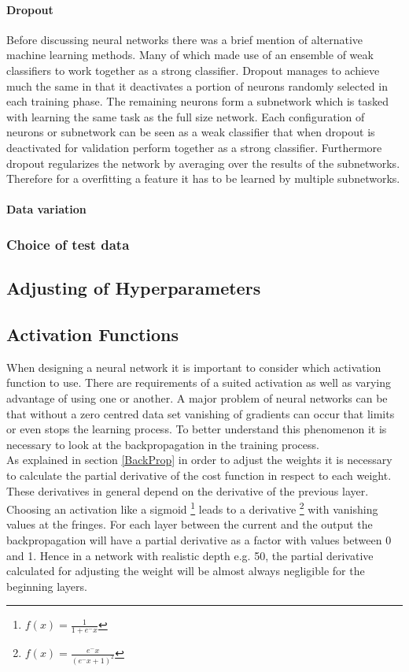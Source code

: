 				\paragraph{Dropout}
					Before discussing neural networks there was a brief mention of alternative machine learning methods. Many of which made use of an ensemble of weak classifiers to work together as a strong classifier. Dropout manages to achieve much the same in that it deactivates a portion of neurons randomly selected in each training phase. The remaining neurons form a subnetwork which is tasked with learning the same task as the full size network. Each configuration of neurons or subnetwork can be seen as a weak classifier that when dropout is deactivated for validation perform together as a strong classifier. Furthermore dropout regularizes the network by averaging over the results of the subnetworks. Therefore for a overfitting a feature it has to be learned by multiple subnetworks.
				\paragraph{Data variation}
					
			\subsubsection{Choice of test data}
		\subsection{Adjusting of Hyperparameters}
			
		\subsection{Activation Functions}
			When designing a neural network it is important to consider which activation function to use. There are requirements of a suited activation as well as varying advantage of using one or another. A major problem of neural networks can be that without a zero centred data set vanishing of gradients can occur that limits or even stops the learning process. To better understand this phenomenon it is necessary to look at the backpropagation in the training process.\\
			As explained in section \ref{BackProp} in order to adjust the weights it is necessary to calculate the partial derivative of the cost function in respect to each weight. These derivatives in general depend on the derivative of the previous layer. Choosing an activation like a sigmoid \footnote{$f(x)=\frac{1}{1+e^-x}$} leads to a derivative \footnote{$f(x)=\frac{e^-x}{(e^-x+1)^2}$} with vanishing values at the fringes. For each layer between the current and the output the backpropagation will have a partial derivative as a factor with values between 0 and 1. Hence in a network with realistic depth e.g. 50, the partial derivative calculated for adjusting the weight will be almost always negligible for the beginning layers.\\
			
